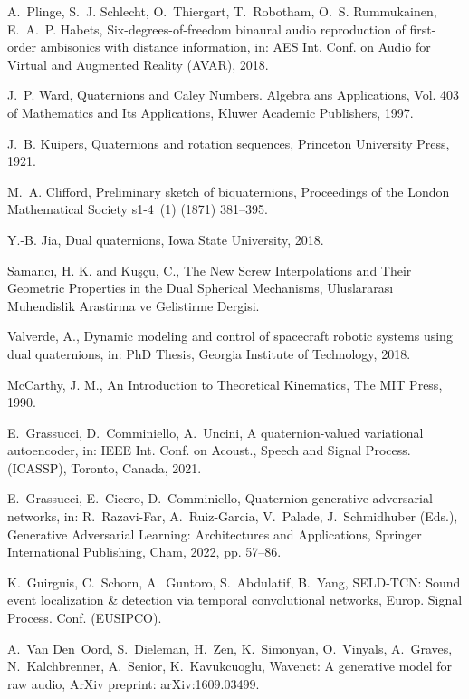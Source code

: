 \documentclass[3p, preprint, twocolumn]{elsarticle}
\begin{document}
\begin{thebibliography}{10}
A.~Plinge, S.~J. Schlecht, O.~Thiergart, T.~Robotham, O.~S. Rummukainen,
  E.~A.~P. Habets, Six-degrees-of-freedom binaural audio reproduction of
  first-order ambisonics with distance information, in: {AES} Int. Conf. on
  Audio for Virtual and Augmented Reality ({AVAR}), 2018.

J.~P. Ward, Quaternions and Caley Numbers. Algebra ans Applications, Vol. 403
  of Mathematics and Its Applications, Kluwer Academic Publishers, 1997.

J.~B. Kuipers, Quaternions and rotation sequences, Princeton University Press,
  1921.

M.~A. Clifford, Preliminary sketch of biquaternions, Proceedings of the London
  Mathematical Society s1-4~(1) (1871) 381--395.

Y.-B. Jia, Dual quaternions, Iowa State University, 2018.

Samancı, H. K. and Kuşçu, C., The New
  Screw Interpolations and Their Geometric Properties in the Dual Spherical
  Mechanisms, Uluslararası Muhendislik Arastirma ve
  Gelistirme Dergisi.

Valverde, A., Dynamic modeling and control
  of spacecraft robotic systems using dual quaternions, in:
  PhD Thesis, Georgia Institute of
  Technology, 2018.

McCarthy, J. M., An Introduction to
  Theoretical Kinematics, The MIT Press,
  1990.

E.~Grassucci, D.~Comminiello, A.~Uncini, A quaternion-valued variational
  autoencoder, in: IEEE Int. Conf. on Acoust., Speech and Signal Process.
  ({ICASSP}), Toronto, Canada, 2021.

E.~Grassucci, E.~Cicero, D.~Comminiello, Quaternion generative adversarial
  networks, in: R.~Razavi-Far, A.~Ruiz-Garcia, V.~Palade, J.~Schmidhuber
  (Eds.), Generative Adversarial Learning: Architectures and Applications,
  Springer International Publishing, Cham, 2022, pp. 57--86.

K.~Guirguis, C.~Schorn, A.~Guntoro, S.~Abdulatif, B.~Yang, {SELD-TCN}: Sound
  event localization \& detection via temporal convolutional networks, Europ.
  Signal Process. Conf. ({EUSIPCO}).

A.~Van Den~Oord, S.~Dieleman, H.~Zen, K.~Simonyan, O.~Vinyals, A.~Graves,
  N.~Kalchbrenner, A.~Senior, K.~Kavukcuoglu, Wavenet: A generative model for
  raw audio, ArXiv preprint: arXiv:1609.03499.


\end{thebibliography}
\end{document}
